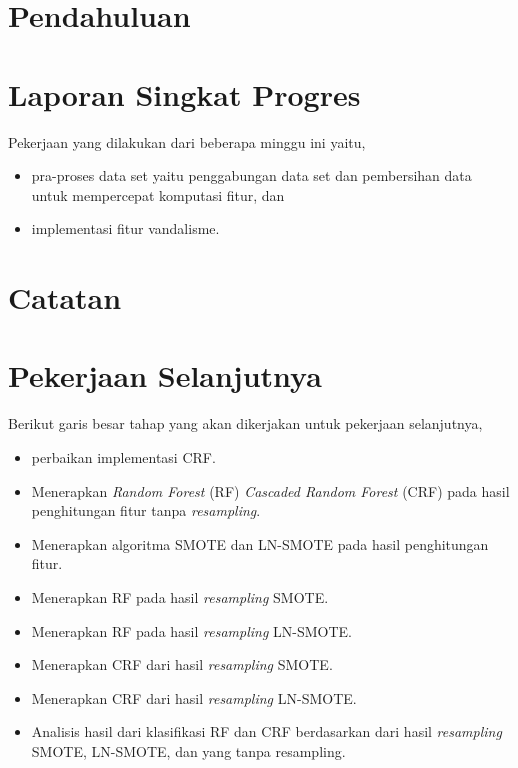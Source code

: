 






\section{Pendahuluan}

\section{Laporan Singkat Progres}

Pekerjaan yang dilakukan dari beberapa minggu ini yaitu,
\begin{itemize}
\item pra-proses data set yaitu penggabungan data set dan pembersihan data untuk
mempercepat komputasi fitur, dan
\item implementasi fitur vandalisme.
\end{itemize}

\section{Catatan}




\clearpage
\section{Pekerjaan Selanjutnya}

Berikut garis besar tahap yang akan dikerjakan untuk pekerjaan selanjutnya,

\begin{itemize}
\item perbaikan implementasi CRF.
\item Menerapkan \textit{Random Forest} (RF) \textit{Cascaded Random Forest}
(CRF) pada hasil penghitungan fitur tanpa \textit{resampling}.
\item Menerapkan algoritma SMOTE dan LN-SMOTE pada hasil penghitungan fitur.
\item Menerapkan RF pada hasil \textit{resampling} SMOTE.
\item Menerapkan RF pada hasil \textit{resampling} LN-SMOTE.
\item Menerapkan CRF dari hasil \textit{resampling} SMOTE.
\item Menerapkan CRF dari hasil \textit{resampling} LN-SMOTE.
\item Analisis hasil dari klasifikasi RF dan CRF berdasarkan dari hasil
\textit{resampling} SMOTE, LN-SMOTE, dan yang tanpa resampling.
\end{itemize}

\clearpage
{}

\advisorsignature

\clearpage
{}
\printbibliography

\newpage
\appendix



